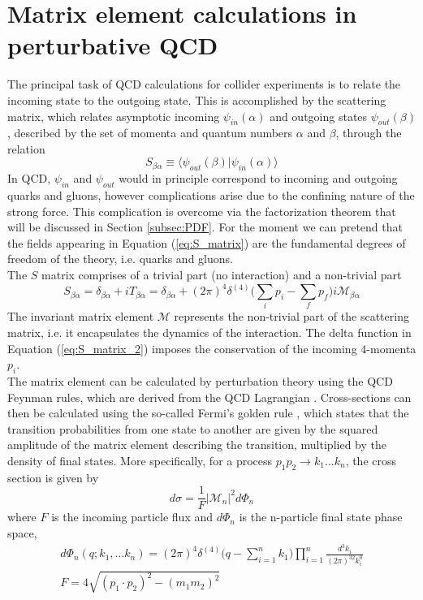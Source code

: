 \section{Matrix element calculations in perturbative QCD} \label{sec:ME_calculations}
\noindent The principal task of QCD calculations for collider experiments is to relate the incoming state to the outgoing state. This is accomplished by the scattering matrix, which relates asymptotic incoming $\psi_{in}(\alpha)$ and outgoing states $\psi_{out}(\beta)$, described by the set of momenta and quantum numbers $\alpha$ and $\beta$, through the relation
\begin{equation}\label{eq:S_matrix}
    S_{\beta\alpha} \equiv \langle\psi_{out}(\beta)|\psi_{in}(\alpha)\rangle
\end{equation}
In QCD, $\psi_{in}$ and $\psi_{out}$ would in principle correspond to incoming and outgoing quarks and gluons, however complications arise due to the confining nature of the strong force. This complication is overcome via the factorization theorem that will be discussed in Section \ref{subsec:PDF}. For the moment we can pretend that the fields appearing in Equation (\ref{eq:S_matrix}) are the fundamental degrees of freedom of the theory, i.e. quarks and gluons.\\
\indent The $S$ matrix comprises of a trivial part (no interaction) and a non-trivial part
\begin{equation}\label{eq:S_matrix_2}
    S_{\beta\alpha} = \delta_{\beta\alpha} + iT_{\beta\alpha} = \delta_{\beta\alpha} + (2\pi)^4\delta^{(4)} \bigg(\sum_i p_i - \sum_f p_f\bigg)i \mathcal{M}_{\beta\alpha}
\end{equation}
The invariant matrix element $\mathcal{M}$ represents the non-trivial part of the scattering matrix, i.e. it encapsulates the dynamics of the interaction. The delta function in Equation (\ref{eq:S_matrix_2}) imposes the conservation of the incoming 4-momenta $p_i$.\\
\indent The matrix element can be calculated by perturbation theory using the QCD Feynman rules, which are derived from the QCD Lagrangian \cite{Perturbative_QCD}. Cross-sections can then be calculated using the so-called Fermi's golden rule \cite{48}, which states that the transition probabilities from one state to another are given by the squared amplitude of the matrix element describing the transition, multiplied by the density of final states. More specifically, for a process $p_1p_2 \rightarrow k_1 \dots k_n$, the cross section is given by
\begin{equation}\label{eq:dsigma}
    d\sigma = \frac{1}{F}|\mathcal{M}_n|^2d\Phi_n
\end{equation}
where $F$ is the incoming particle flux and $d\Phi_n$ is the n-particle final state phase space,
\begin{equation}
\begin{gathered}
    d\Phi_n(q;k_1,\dots k_n) = (2\pi)^4 \delta^{(4)}\bigg(q - \sum_{i=1}^n k_1\bigg) \prod_{i=1}^n \frac{d^3k_i}{(2\pi)^32k_i^0} \\
    F = 4\sqrt{(p_1 \cdot p_2)^2 - (m_1 m_2)^2}
    \end{gathered}
\end{equation}

